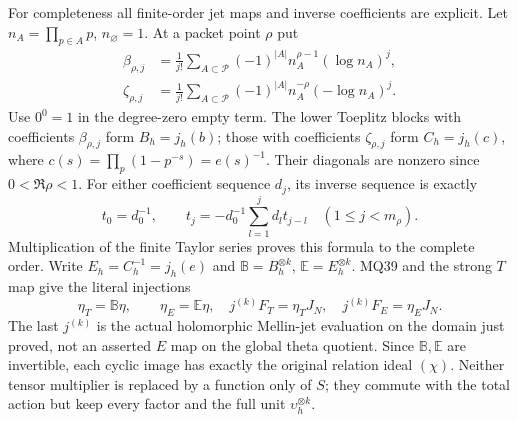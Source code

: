 For completeness all finite-order jet maps and inverse coefficients
are explicit. Let $n_A=\prod_{p\in A}p$, $n_\varnothing=1$.
At a packet point $\rho$ put
\[
 \begin{split}
 \beta_{\rho,j}&=\frac1{j!}\sum_{A\subset\mathcal P}
       (-1)^{|A|}n_A^{\rho-1}(\log n_A)^j,\\
 \zeta_{\rho,j}&=\frac1{j!}\sum_{A\subset\mathcal P}
       (-1)^{|A|}n_A^{-\rho}(-\log n_A)^j.
 \end{split}                                                 \tag{MQ40}
\]
Use $0^0=1$ in the degree-zero empty term. The lower Toeplitz
blocks with coefficients $\beta_{\rho,j}$ form $B_h=j_h(b)$;
those with coefficients $\zeta_{\rho,j}$ form $C_h=j_h(c)$,
where $c(s)=\prod_p(1-p^{-s})=e(s)^{-1}$. Their diagonals are
nonzero since $0<\Re\rho<1$. For either coefficient sequence
$d_j$, its inverse sequence is exactly
\[
 t_0=d_0^{-1},\qquad
 t_j=-d_0^{-1}\sum_{l=1}^jd_lt_{j-l}\quad(1\le j<m_\rho).
                                                               \tag{MQ41}
\]
Multiplication of the finite Taylor series proves this formula to
the complete order. Write $E_h=C_h^{-1}=j_h(e)$ and
$\mathbb B=B_h^{\otimes k}$, $\mathbb E=E_h^{\otimes k}$.
MQ39 and the strong $T$ map give the literal injections
\[
 \eta_T=\mathbb B\eta,\qquad \eta_E=\mathbb E\eta,
 \quad j^{(k)}F_T=\eta_TJ_N,\quad j^{(k)}F_E=\eta_EJ_N.
                                                               \tag{MQ42}
\]
The last $j^{(k)}$ is the actual holomorphic Mellin-jet evaluation
on the domain just proved, not an asserted $E$ map on the global
theta quotient. Since $\mathbb B,\mathbb E$ are invertible, each
cyclic image has exactly the original relation ideal $(\chi)$.
Neither tensor multiplier is replaced by a function only of $S$;
they commute with the total action but keep every factor and the
full unit $\upsilon_h^{\otimes k}$.

